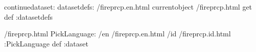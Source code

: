 \begin{ingrid}
continuedataset:
datasetdefs:
/fireprcp.en.html currentobject /fireprcp.html get def
:datasetdefs

/fireprcp.html {
PickLanguage:
/en /fireprcp.en.html
/id /fireprcp.id.html
:PickLanguage
} def
:dataset
\end{ingrid}
